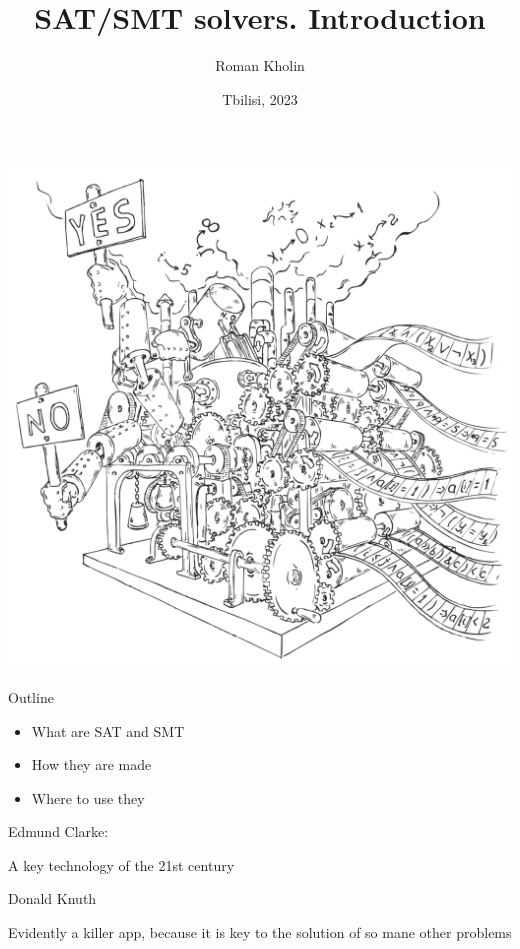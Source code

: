 \documentclass[mathserif]{beamer}
\begin{document}
\title{SAT/SMT solvers. Introduction}
\author{Roman Kholin}
\date{Tbilisi, 2023}

\begin{frame}
\includegraphics[scale=0.5]{../decision-procedure.png}
\end{frame}

\frame{\titlepage}

\begin{frame}{Outline}
\begin{itemize}
\item What are SAT and SMT
\item How they are made
\item Where to use they
\end{itemize}
\end{frame}

\begin{frame}
Edmund Clarke:
\begin{block}{}
A key technology of the 21st century
\end{block}
Donald Knuth
\begin{block}{}
Evidently a killer app, because it is key to the solution of so mane other problems
\end{block}
\end{frame}
\end{document}
